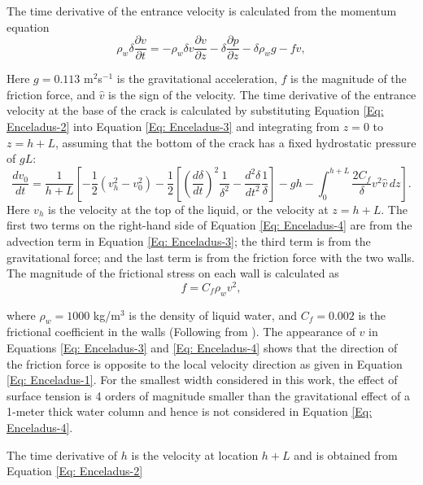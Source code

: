 \documentclass[draft]{agujournal2019}
\begin{document}
\begin{refsection}
The time derivative of the entrance velocity is calculated from the momentum equation
\begin{equation}
    \rho_w \delta \frac{\partial v}{\partial t} = -\rho_w \delta v \frac{\partial v}{\partial z} - \delta \frac{\partial p}{\partial z} - \delta \rho_w g - f \hat{v},
    \label{Eq: Enceladus-3}
\end{equation}

Here $g=0.113$ m$^2$s$^{-1}$ is the gravitational acceleration, $f$ is the magnitude of the friction force, and $\hat{v}$ is the sign of the velocity. The time derivative of the entrance velocity at the base of the crack is calculated by substituting Equation \ref{Eq: Enceladus-2} into Equation \ref{Eq: Enceladus-3} and integrating from $z = 0$ to $z = h + L$, assuming that the bottom of the crack has a fixed hydrostatic pressure of $gL$:
\begin{equation}
    \frac{dv_0}{dt} = \frac{1}{h+L} \left[ -\frac{1}{2} \left( v_h^2 - v_0^2 \right) 
- \frac{1}{2} \left[ \left( \frac{d\delta}{dt} \right)^2 \frac{1}{\delta^2} - \frac{d^2\delta}{dt^2} \frac{1}{\delta} \right] 
- gh - \int_0^{h+L} \frac{2C_f}{\delta} v^2 \hat{v} \, dz \right].
\label{Eq: Enceladus-4}
\end{equation}
Here $v_h$ is the velocity at the top of the liquid, or the velocity at $z=h+L$. The first two terms on the right-hand side of Equation \ref{Eq: Enceladus-4} are from the advection term in Equation \ref{Eq: Enceladus-3}; the third term is from the gravitational force; and the last term is from the friction force with the two walls. The magnitude of the frictional stress on each wall is calculated as
\begin{equation}
    f=C_f\rho_w v^2,
\end{equation}

where $\rho_w=1000$ kg/m$^3$ is the density of liquid water, and $C_f=0.002$ is the frictional coefficient in the walls (Following from ). The appearance of $\hat{v}$ in Equations \ref{Eq: Enceladus-3} and \ref{Eq: Enceladus-4} shows that the direction of the friction force is opposite to the local velocity direction as given in Equation \ref{Eq: Enceladus-1}. For the smallest width considered in this work, the effect of surface tension is 4 orders of magnitude smaller than the gravitational effect of a 1-meter thick water column and hence is not considered in Equation \ref{Eq: Enceladus-4}.

The time derivative of $h$ is the velocity at location $h+L$ and is obtained from Equation \ref{Eq: Enceladus-2}


\end{refsection}
\end{document}
